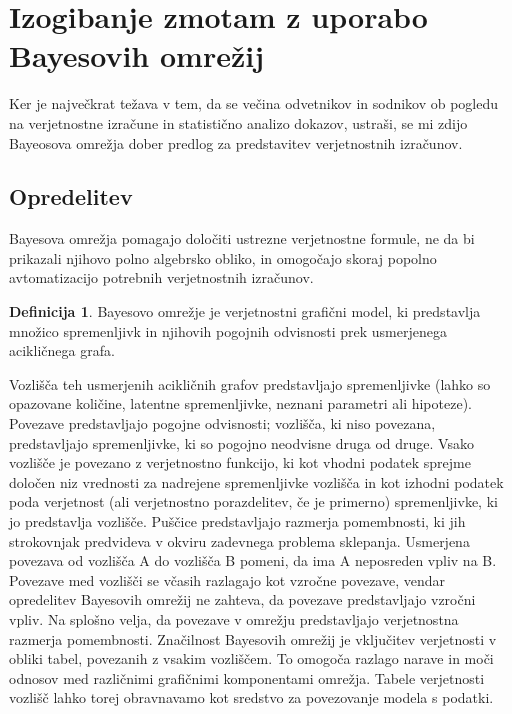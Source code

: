 \documentclass[12pt,a4paper]{amsart}
\theoremstyle{definition} %
\newtheorem{definicija}{Definicija}[section]
\theoremstyle{plain} %
\begin{document}
\section{Izogibanje zmotam z uporabo Bayesovih omrežij}
Ker je največkrat težava v tem, da se večina odvetnikov in sodnikov ob pogledu na verjetnostne izračune in statistično analizo dokazov, ustraši, se mi 
zdijo Bayeosova omrežja dober predlog za predstavitev verjetnostnih izračunov.

\subsection{Opredelitev}
Bayesova omrežja pomagajo določiti ustrezne verjetnostne formule, ne da bi prikazali njihovo polno algebrsko obliko, in omogočajo
skoraj popolno avtomatizacijo potrebnih verjetnostnih izračunov.
\begin{definicija}
   Bayesovo omrežje je verjetnostni grafični model, ki predstavlja množico spremenljivk in njihovih pogojnih odvisnosti prek usmerjenega
   acikličnega grafa.
\end{definicija}
Vozlišča teh usmerjenih acikličnih grafov predstavljajo spremenljivke (lahko so opazovane količine, latentne spremenljivke, neznani parametri
ali hipoteze). Povezave predstavljajo pogojne odvisnosti; vozlišča, ki niso povezana, predstavljajo spremenljivke, ki so pogojno neodvisne
druga od druge. Vsako vozlišče je povezano z verjetnostno funkcijo, ki kot vhodni podatek sprejme določen niz vrednosti za nadrejene spremenljivke
vozlišča in kot izhodni podatek poda verjetnost (ali verjetnostno porazdelitev, če je primerno) spremenljivke, ki jo predstavlja vozlišče. Puščice
predstavljajo razmerja pomembnosti, ki jih strokovnjak predvideva v okviru zadevnega problema sklepanja. Usmerjena povezava od vozlišča A do
vozlišča B pomeni, da ima A neposreden vpliv na B. Povezave med vozlišči se včasih razlagajo kot vzročne povezave, vendar opredelitev Bayesovih
omrežij ne zahteva, da povezave predstavljajo vzročni vpliv. Na splošno velja, da povezave v omrežju predstavljajo verjetnostna razmerja
pomembnosti. Značilnost Bayesovih omrežij je vključitev verjetnosti v obliki tabel, povezanih z vsakim vozliščem. To omogoča razlago narave in
moči odnosov med različnimi grafičnimi komponentami omrežja. Tabele verjetnosti vozlišč lahko torej obravnavamo kot sredstvo za povezovanje
modela s podatki.
\end{document}
